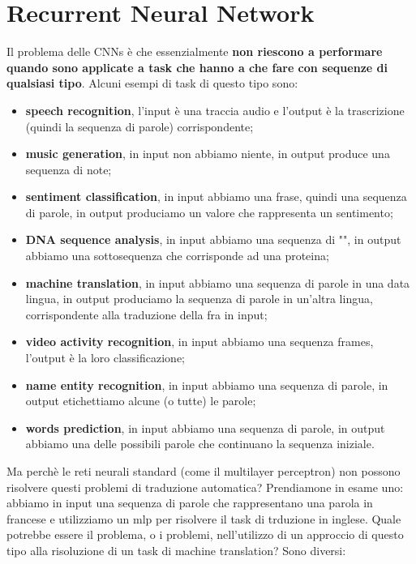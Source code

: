 \chapter{Recurrent Neural Network}
Il problema delle CNNs è che essenzialmente \textbf{non riescono a performare 
quando sono applicate a task che hanno a che fare con sequenze di qualsiasi tipo}.
Alcuni esempi di task di questo tipo sono:
\begin{itemize}
   \item \textbf{speech recognition}, l'input è una traccia audio e 
   l'output è la trascrizione (quindi la sequenza di parole) corrispondente; 
   \item \textbf{music generation}, in input non abbiamo niente, in output 
   produce una sequenza di note;
   \item \textbf{sentiment classification}, in input abbiamo una frase, 
   quindi una sequenza di parole, in output produciamo un valore che rappresenta un sentimento;
   \item \textbf{DNA sequence analysis}, in input abbiamo una sequenza di "", 
   in output abbiamo una sottosequenza che corrisponde ad una proteina;
   \item \textbf{machine translation}, in input abbiamo una sequenza di parole in una data lingua, 
   in output produciamo la sequenza di parole in un'altra lingua, corrispondente alla
   traduzione della fra in input;
   \item \textbf{video activity recognition}, in input abbiamo una sequenza frames, 
   l'output è la loro classificazione;
   \item \textbf{name entity recognition}, in input abbiamo una sequenza di parole, 
   in output etichettiamo alcune (o tutte) le parole;
   \item \textbf{words prediction}, in input abbiamo una sequenza di parole, in output 
   abbiamo una delle possibili parole che continuano la sequenza iniziale.
\end{itemize}
\newpage
Ma perchè le reti neurali standard (come il multilayer perceptron)
non possono risolvere questi problemi di traduzione automatica? 
Prendiamone in esame uno: abbiamo in input una sequenza di parole che 
rappresentano una parola in francese e utilizziamo un mlp per risolvere il 
task di trduzione in inglese. Quale potrebbe essere il problema, o i problemi,
nell'utilizzo di un approccio di questo tipo alla risoluzione di un task di
machine translation? Sono diversi:
